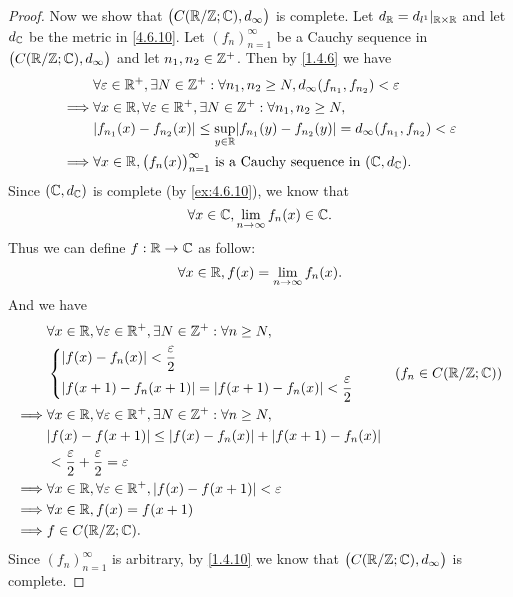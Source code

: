 \begin{proof}
  Now we show that \(\big(C(\mathbb{R} / \mathbb{Z} ; \mathbb{C}), d_\infty\big)\) is complete.
  Let \(d_{\mathbb{R}} = d_{l^1}|_{\mathbb{R} \times \mathbb{R}}\) and let \(d_{\mathbb{C}}\) be the metric in \cref{4.6.10}.
  Let \((f_n)_{n = 1}^\infty\) be a Cauchy sequence in \(\big(C(\mathbb{R} / \mathbb{Z} ; \mathbb{C}), d_\infty\big)\) and let \(n_1, n_2 \in \mathbb{Z}^+\).
  Then by \cref{1.4.6} we have
  \begin{align*}
             & \forall \varepsilon \in \R^+, \exists N \in \Z^+ : \forall n_1, n_2 \geq N, d_\infty(f_{n_1}, f_{n_2}) < \varepsilon        \\
    \implies & \forall x \in \R, \forall \varepsilon \in \R^+, \exists N \in \Z^+ : \forall n_1, n_2 \geq N,                               \\
             & \abs{f_{n_1}(x) - f_{n_2}(x)} \leq \sup_{y \in \R} \abs{f_{n_1}(y) - f_{n_2}(y)} = d_\infty(f_{n_1}, f_{n_2}) < \varepsilon \\
    \implies & \forall x \in \R, \big(f_n(x)\big)_{n = 1}^\infty \text{ is a Cauchy sequence in } (\C, d_{\C}).
  \end{align*}
  Since \((\mathbb{C}, d_{\mathbb{C}})\) is complete (by \cref{ex:4.6.10}), we know that
  \[
    \forall x \in \mathbb{C}, \lim_{n \to \infty} f_n(x) \in \mathbb{C}.
  \]
  Thus we can define \(f : \mathbb{R} \to \mathbb{C}\) as follow:
  \[
    \forall x \in \mathbb{R}, f(x) = \lim_{n \to \infty} f_n(x).
  \]
  And we have
  \begin{align*}
             & \forall x \in \R, \forall \varepsilon \in \R^+, \exists N \in \Z^+ : \forall n \geq N, \\
             & \begin{dcases}
                 \abs{f(x) - f_n(x)} < \dfrac{\varepsilon}{2} \\
                 \abs{f(x + 1) - f_n(x + 1)} = \abs{f(x + 1) - f_n(x)} < \dfrac{\varepsilon}{2}
               \end{dcases}         & (f_n \in C(\R / \Z ; \C))          \\
    \implies & \forall x \in \R, \forall \varepsilon \in \R^+, \exists N \in \Z^+ : \forall n \geq N, \\
             & \abs{f(x) - f(x + 1)} \leq \abs{f(x) - f_n(x)} + \abs{f(x + 1) - f_n(x)}               \\
             & < \dfrac{\varepsilon}{2} + \dfrac{\varepsilon}{2} = \varepsilon                        \\
    \implies & \forall x \in \R, \forall \varepsilon \in \R^+, \abs{f(x) - f(x + 1)} < \varepsilon    \\
    \implies & \forall x \in \R, f(x) = f(x + 1)                                                      \\
    \implies & f \in C(\R / \Z ; \C).
  \end{align*}
  Since \((f_n)_{n = 1}^\infty\) is arbitrary, by \cref{1.4.10} we know that \(\big(C(\mathbb{R} / \mathbb{Z} ; \mathbb{C}), d_\infty\big)\) is complete.
\end{proof}